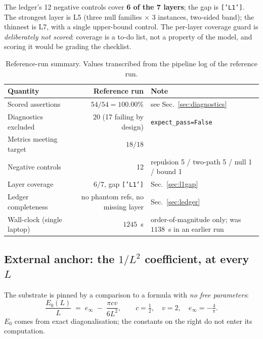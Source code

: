 \documentclass[11pt,a4paper]{article}
\newcommand{\code}[1]{\texttt{\small #1}}
\begin{document}
The ledger's 12 negative controls cover \textbf{6 of the 7 layers}; the gap is
\code{['L1']}. The strongest layer is L5 (three null families $\times$ 3 instances,
two-sided band); the thinnest is L7, with a single upper-bound control. The
per-layer coverage guard is \emph{deliberately not scored}: coverage is a to-do
list, not a property of the model, and scoring it would be grading the checklist.

\begin{table}[h]
\centering\small
\begin{tabular}{@{}lrl@{}}
\toprule
\textbf{Quantity} & \textbf{Reference run} & \textbf{Note} \\
\midrule
Scored assertions & $54/54 = 100.00\%$ & see Sec.~\ref{sec:diagnostics} \\
Diagnostics excluded & 20 (17 failing by design) & \code{expect\_pass=False} \\
Metrics meeting target & $18/18$ & \\
Negative controls & 12 & repulsion 5 / two-path 5 / null 1 / bound 1 \\
Layer coverage & $6/7$, gap \code{['L1']} & Sec.~\ref{sec:l1gap} \\
Ledger completeness & no phantom refs, no missing layer & Sec.~\ref{sec:ledger} \\
Wall-clock (single laptop) & $1245$~s & order-of-magnitude only; was $1138$~s in an earlier run \\
\bottomrule
\end{tabular}
\caption{Reference-run summary. Values transcribed from the pipeline log of the
reference run.}
\label{tab:summary}
\end{table}

\subsection{External anchor: the $1/L^2$ coefficient, at every $L$}
\label{sec:anchor}

The substrate is pinned by a comparison to a formula with \emph{no free
parameters}:
\begin{equation}
  \frac{E_0(L)}{L} \;=\; e_\infty \;-\; \frac{\pi c v}{6 L^2},
  \qquad c = \tfrac12,\quad v = 2,\quad e_\infty = -\tfrac{4}{\pi}.
  \label{eq:cft}
\end{equation}
$E_0$ comes from exact diagonalisation; the constants on the right do not enter its
computation.
\end{document}
